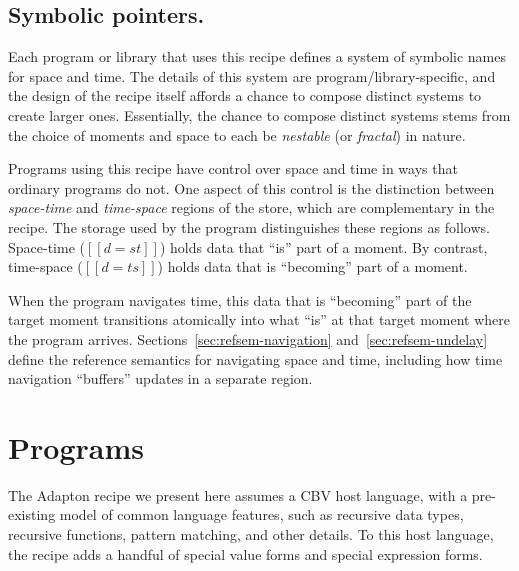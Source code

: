 \documentclass[11pt]{article}
\begin{document}
\subsection{Symbolic pointers.}

Each program or library that uses this recipe
defines a system of symbolic names for space and time.
The details of this system are program/library-specific, and the
design of the recipe itself affords a chance to compose distinct systems to
create larger ones.
Essentially, the chance to compose distinct systems stems from the choice of moments
and space to each be \emph{nestable} (or \emph{fractal}) in nature.

\nolinenumbers
\ottgrammartabular{
  {\makeLineNumber\stepLineNumber} \ottSpace
  \\
   {\makeLineNumber\stepLineNumber} \ottMoment
  \\
   {\makeLineNumber\stepLineNumber} \ottp
  \\
   {\makeLineNumber\stepLineNumber} \ottpp
  \\
  {\makeLineNumber\stepLineNumber} \ottd
}
\linenumbers

Programs using this recipe have control over space and time in ways
that ordinary programs do not.
%
One aspect of this control is the distinction between
\emph{space-time} and \emph{time-space} regions of the store, which are complementary in
the recipe.
%
The storage used by the program distinguishes these regions as follows.
%
Space-time ($[[d = st]]$) holds data that ``is'' part of a moment.
By contrast,
time-space ($[[d = ts]]$) holds data that is ``becoming'' part of a moment.

When the program navigates time, this data that is ``becoming'' part
of the target moment transitions atomically into what ``is'' at that
target moment where the program arrives.
%
Sections~\ref{sec:refsem-navigation} and~\ref{sec:refsem-undelay}
define the reference semantics for navigating space and time, including
how time navigation ``buffers'' updates in a separate region.


\section{Programs}
\label{sec:programs}

The Adapton recipe we present here assumes a CBV host language, with a
pre-existing model of common language features, such as recursive data
types, recursive functions, pattern matching, and other details.
%
To this host language, the recipe adds a handful of special value
forms and special expression forms.
\end{document}
